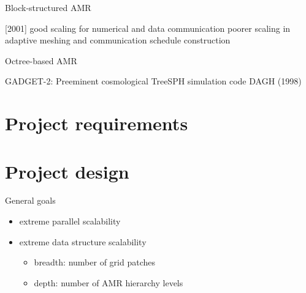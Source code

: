 \documentclass[14pt]{article}
\begin{document}
  Block-structured AMR


   [2001]
   good scaling for numerical and data communication
   poorer scaling in adaptive meshing and communication schedule construction 


  Octree-based AMR

GADGET-2: Preeminent cosmological TreeSPH simulation code
DAGH (1998)

\section{Project requirements}

\section{Project design}

General goals

\begin{itemize}
\item extreme parallel scalability
\item extreme data structure scalability
  \begin{itemize}
  \item breadth: number of grid patches
  \item depth: number of AMR hierarchy levels
  \end{itemize}
\end{itemize}
\end{document}

